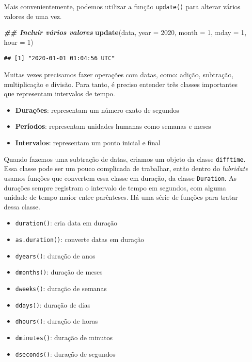 \documentclass[
]{article}
\newenvironment{Shaded}{\begin{snugshade}}{\end{snugshade}}
\newcommand{\AttributeTok}[1]{\textcolor[rgb]{0.13,0.29,0.53}{#1}}
\newcommand{\DecValTok}[1]{\textcolor[rgb]{0.00,0.00,0.81}{#1}}
\newcommand{\DocumentationTok}[1]{\textcolor[rgb]{0.56,0.35,0.01}{\textbf{\textit{#1}}}}
\newcommand{\FunctionTok}[1]{\textcolor[rgb]{0.13,0.29,0.53}{\textbf{#1}}}
\newcommand{\NormalTok}[1]{#1}
\providecommand{\tightlist}{%
  \setlength{\itemsep}{0pt}\setlength{\parskip}{0pt}}
\begin{document}
Mais convenientemente, podemos utilizar a função \texttt{update()} para alterar vários valores de uma vez.

\begin{Shaded}
\begin{Highlighting}[]
\DocumentationTok{\#\# Incluir vários valores}
\FunctionTok{update}\NormalTok{(data, }\AttributeTok{year =} \DecValTok{2020}\NormalTok{, }\AttributeTok{month =} \DecValTok{1}\NormalTok{, }\AttributeTok{mday =} \DecValTok{1}\NormalTok{, }\AttributeTok{hour =} \DecValTok{1}\NormalTok{)}
\end{Highlighting}
\end{Shaded}

\begin{verbatim}
## [1] "2020-01-01 01:04:56 UTC"
\end{verbatim}

Muitas vezes precisamos fazer operações com datas, como: adição, subtração, multiplicação e divisão. Para tanto, é preciso entender três classes importantes que representam intervalos de tempo.

\begin{itemize}
\tightlist
\item
  \textbf{Durações}: representam um número exato de segundos
\item
  \textbf{Períodos}: representam unidades humanas como semanas e meses
\item
  \textbf{Intervalos}: representam um ponto inicial e final
\end{itemize}

Quando fazemos uma subtração de datas, criamos um objeto da classe \texttt{difftime}. Essa classe pode ser um pouco complicada de trabalhar, então dentro do \emph{lubridate} usamos funções que convertem essa classe em duração, da classe \texttt{Duration}. As durações sempre registram o intervalo de tempo em segundos, com alguma unidade de tempo maior entre parênteses. Há uma série de funções para tratar dessa classe.

\begin{itemize}
\tightlist
\item
  \texttt{duration()}: cria data em duração
\item
  \texttt{as.duration()}: converte datas em duração
\item
  \texttt{dyears()}: duração de anos
\item
  \texttt{dmonths()}: duração de meses
\item
  \texttt{dweeks()}: duração de semanas
\item
  \texttt{ddays()}: duração de dias
\item
  \texttt{dhours()}: duração de horas
\item
  \texttt{dminutes()}: duração de minutos
\item
  \texttt{dseconds()}: duração de segundos
\end{itemize}
\end{document}
